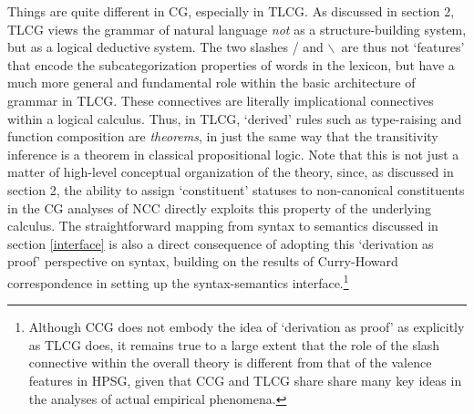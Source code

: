 \documentclass[output=paper]{langsci/langscibook}
\begin{document}
Things are quite different in CG, especially in TLCG. As discussed in
section 2, TLCG views the grammar of natural language \emph{not} as a
structure-building system, but as a logical deductive system. The two
slashes / and \ensuremath{\backslash}\ are thus not `features' that encode the
subcategorization properties of words in the lexicon, but have a much
more general and fundamental role within the basic architecture of
grammar in TLCG. These connectives are literally 
implicational connectives within a logical calculus. Thus, in TLCG,
`derived' rules such as
type-raising and function composition are \emph{theorems}, in just the same
way that the 
transitivity inference is a theorem in classical propositional logic.
Note that this is not just a matter of high-level conceptual
organization of the theory, since, as discussed in section 2, the
ability to assign `constituent' statuses to non-canonical constituents
in the CG analyses of NCC directly exploits this property of the
underlying calculus. The straightforward mapping from syntax to
semantics discussed in section \ref{interface} is also a direct
consequence of adopting this `derivation as proof' perspective on
syntax, building on the results of Curry-Howard correspondence  in
setting up the syntax-semantics interface.\footnote{Although CCG does
not embody the idea of `derivation as proof' as explicitly as TLCG
does, it remains true to a large extent that the role of the slash
connective within the overall theory is different from that of the
valence features in HPSG, given that CCG and TLCG share share many key
ideas in the analyses of actual empirical phenomena.}


\end{document}
